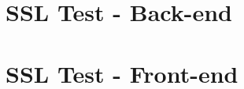 \documentclass[
    12pt,               %
    openright,          %
    oneside,
    a4paper,            %
    english,            %
    brazil              %
    ]{ifsp-spo-inf-ctds} %
\begin{document}
\begin{apendicesenv}
\chapter{SSL Test - Back-end}
\label{ssltest-backend}




\chapter{SSL Test - Front-end}
\label{ssltest-frontend}



\end{apendicesenv}
\end{document}
